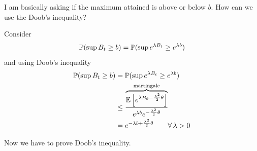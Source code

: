 \documentclass{report}
\begin{document}
\begin{example}
\begin{figure}[H]
		\label{fig:screenshot018}
	\end{figure}
	I am basically asking if the maximum attained is above or below $b$.
	How can we use the Doob's inequality?
	\begin{fancyproof}
		Consider
		\begin{equation*}
			\mathbb{P}(\sup B_{t}\geq b)=\mathbb{P}(\sup e^{\lambda B_{t}}\geq e^{\lambda b})
		\end{equation*}
		and using Doob's inequality
		\begin{align*}
				\mathbb{P}(\sup B_{t}\geq b)&=\mathbb{P}(\sup e^{\lambda B_{t}}\geq e^{\lambda b})\\
				&\leq \frac{\overbrace{\mathbb{E}\left[e^{\lambda B_{\theta}-\frac{\lambda^{2}}{2}\theta}\right]}^{\text{martingale}}}{e^{\lambda b}e^{-\frac{\lambda^{2}}{2}\theta}}\\
				&=e^{-\lambda b+\frac{\lambda^{2}}{2}\theta}\qquad\forall\,\lambda>0
			\end{align*}
	\end{fancyproof}
\end{example}
Now we have to prove Doob's inequality.
\end{document}
